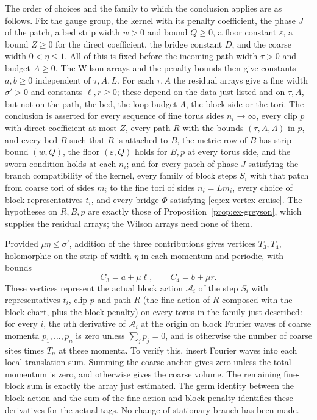 The order of choices and the family to which the conclusion applies
are as follows. Fix the gauge group, the kernel with its penalty
coefficient, the phase $J$ of the patch, a bed strip width $w>0$ and
bound $Q\geq0$, a floor constant $\varepsilon$, a bound $Z\geq0$ for the
direct coefficient, the bridge constant $D$, and the coarse width
$0<\eta\leq1$. All of this is fixed before the incoming path width
$\tau>0$ and budget $A\geq0$. The Wilson arrays and the penalty bounds
then give constants $a,b\geq0$ independent of $\tau,A,L$. For each
$\tau,A$ the residual arrays give a fine width $\sigma'>0$ and constants
$\ell,r\geq0$; these depend on the data just listed and on $\tau,A$,
but not on the path, the bed, the loop budget $\Lambda$, the block side
or the tori. The conclusion is asserted for every sequence of fine torus
sides $n_i\to\infty$, every clip $p$ with direct coefficient at most
$Z$, every path $R$ with the bounds $(\tau,A,\Lambda)$ in $p$, and every
bed $B$ such that $R$ is attached to $B$, the metric row of $B$ has
strip bound $(w,Q)$, the floor $(\varepsilon,Q)$ holds for $B,p$ at
every torus side, and the sworn condition holds at each $n_i$; and for
every patch of phase $J$ satisfying the branch compatibility of the
kernel, every family of block steps $S_i$ with that patch from coarse
tori of sides $m_i$ to the fine tori of sides $n_i=Lm_i$, every choice
of block representatives $t_i$, and every bridge $\Phi$ satisfying
\eqref{eq:ex-vertex-cruise}. The hypotheses on $R,B,p$ are exactly those
of Proposition~\ref{prop:ex-greyson}, which supplies the residual
arrays; the Wilson arrays need none of them.

Provided $\mu\eta\leq\sigma'$, addition of the three contributions gives
vertices $T_3,T_4$, holomorphic on the strip of width $\eta$ in each
momentum and periodic, with bounds
\begin{equation}\label{eq:ex-classical-vertex-prices}
                    C_3=a+\mu\ell,\qquad C_4=b+\mu r.
\end{equation}
These vertices represent the actual block action
$\mathcal A_i$ of the step $S_i$ with representatives $t_i$, clip $p$
and path $R$ (the fine action of $R$ composed with the block chart, plus
the block penalty) on every torus in the family just described: for
every $i$, the $n$th derivative of $\mathcal A_i$ at the origin on
block Fourier waves of coarse momenta $p_1,\ldots,p_n$ is zero unless
$\sum_jp_j=0$, and is otherwise the number of coarse sites times $T_n$
at these momenta. To verify this, insert Fourier waves into each local
translation sum. Summing the coarse anchor gives zero unless the total
momentum is zero, and otherwise gives the coarse volume. The remaining
fine-block sum is exactly the array just estimated. The germ identity
between the block action and the sum of the fine action and block
penalty identifies these derivatives for the actual tags. No change of
stationary branch has been made.

